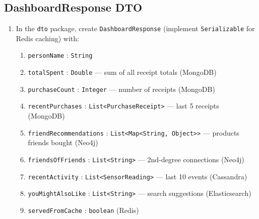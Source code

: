 \documentclass[a4paper]{article}
\begin{document}
\subsection*{DashboardResponse DTO}
\begin{enumerate}
  \item In the \texttt{dto} package, create \texttt{DashboardResponse} (implement \texttt{Serializable} for Redis caching) with:
    \begin{enumerate}
      \item \texttt{personName} : \texttt{String}
      \item \texttt{totalSpent} : \texttt{Double} --- sum of all receipt totals (MongoDB)
      \item \texttt{purchaseCount} : \texttt{Integer} --- number of receipts (MongoDB)
      \item \texttt{recentPurchases} : \texttt{List<PurchaseReceipt>} --- last 5 receipts (MongoDB)
      \item \texttt{friendRecommendations} : \texttt{List<Map<String, Object>{}>} --- products friends bought (Neo4j)
      \item \texttt{friendsOfFriends} : \texttt{List<String>} --- 2nd-degree connections (Neo4j)
      \item \texttt{recentActivity} : \texttt{List<SensorReading>} --- last 10 events (Cassandra)
      \item \texttt{youMightAlsoLike} : \texttt{List<String>} --- search suggestions (Elasticsearch)
      \item \texttt{servedFromCache} : \texttt{boolean} (Redis)
    \end{enumerate}
\end{enumerate}
\end{document}
